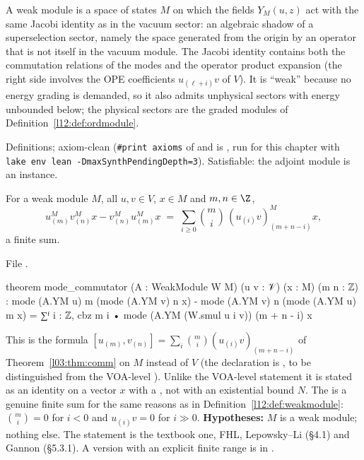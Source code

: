 \begin{physics}
A weak module is a space of states $M$ on which the fields $Y_M(u,z)$ act with the same Jacobi identity as in the
vacuum sector: an algebraic shadow of a superselection sector, namely the space generated from the origin by an
operator that is not itself in the vacuum module. The Jacobi identity contains both the commutation relations of the modes and the
operator product expansion (the right side involves the OPE coefficients $u_{(\ell+i)}v$ of $V$). It is
``weak'' because no energy grading is demanded, so it also admits unphysical sectors with energy unbounded below;
the physical sectors are the graded modules of Definition~\ref{l12:def:ordmodule}.
\end{physics}

\begin{status}
Definitions; axiom-clean (\texttt{\#print axioms} of  and  is
\lean{[propext, Classical.}\allowbreak{}\allowbreak\lean{sound]}, run for this chapter with
\texttt{lake env lean -DmaxSynthPendingDepth=3}). Satisfiable: the adjoint module is an instance.
\end{status}

\begin{theorem}\label{l12:thm:modcomm}
For a weak module $M$, all $u,v\in V$, $x\in M$ and $m,n\in\Z$,
\begin{equation*}
 u^M_{(m)}v^M_{(n)}x - v^M_{(n)}u^M_{(m)}x \;=\; \sum_{i\ge0}\binom mi\,(u_{(i)}v)^M_{(m+n-i)}x ,
\end{equation*}
a finite sum.
\end{theorem}
\noindent File .
\begin{leancode}
theorem mode_commutator (A : WeakModule W M) (u v : 𝒱) (x : M) (m n : ℤ) :
    mode (A.YM u) m (mode (A.YM v) n x) - mode (A.YM v) n (mode (A.YM u) m x)
      = ∑ᶠ i : ℤ, cbz m i • mode (A.YM (W.smul u i v)) (m + n - i) x
\end{leancode}

\begin{dictionary}
This is the formula $[u_{(m)},v_{(n)}] = \sum_i\binom mi(u_{(i)}v)_{(m+n-i)}$ of Theorem~\ref{l03:thm:comm} on $M$ instead of
$V$ (the declaration is , to be distinguished from the VOA-level
). Unlike the VOA-level statement it is stated as an identity on a vector $x$ with a
, not with an existential bound $N$. The  is a genuine finite sum for the same reasons as in
Definition~\ref{l12:def:weakmodule}: $\binom mi = 0$ for $i<0$ and $u_{(i)}v = 0$ for $i\gg0$. \textbf{Hypotheses:} $M$ is a weak
module; nothing else. The statement is the textbook one, FHL, Lepowsky--Li (\S4.1) and Gannon (\S5.3.1).
A version with an explicit finite range is  in .
\end{dictionary}

